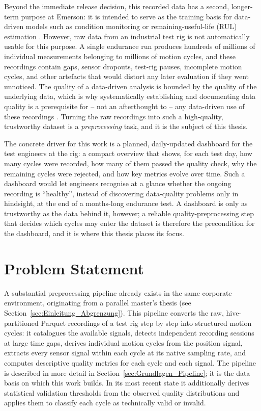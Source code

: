 Beyond the immediate release decision, this recorded data has a second, longer-term
purpose at Emerson: it is intended to serve as the training basis for data-driven models
such as condition monitoring or remaining-useful-life (RUL)
estimation \parencite{TODO-condition-monitoring}. However, raw data from an industrial
test rig is not automatically usable for this purpose. A single endurance run produces
hundreds of millions of individual measurements belonging to millions of motion cycles,
and these recordings contain gaps, sensor dropouts, test-rig pauses, incomplete motion
cycles, and other artefacts that would distort any later evaluation if they went
unnoticed. The quality of a data-driven analysis is bounded by the quality of the
underlying data, which is why systematically establishing and documenting data quality is
a prerequisite for -- not an afterthought to -- any data-driven use of these
recordings \parencite{TODO-data-quality}. Turning the raw recordings into such a
high-quality, trustworthy dataset is a \emph{preprocessing} task, and it is the subject of
this thesis.

The concrete driver for this work is a planned, daily-updated dashboard for the test
engineers at the rig: a compact overview that shows, for each test day, how many cycles
were recorded, how many of them passed the quality check, why the remaining cycles were
rejected, and how key metrics evolve over time. Such a dashboard would let engineers
recognise at a glance whether the ongoing recording is ``healthy'', instead of
discovering data-quality problems only in hindsight, at the end of a months-long endurance
test. A dashboard is only as trustworthy as the data behind it, however; a reliable
quality-preprocessing step that decides which cycles may enter the dataset is therefore
the precondition for the dashboard, and it is where this thesis places its focus.

\section{Problem Statement}
\label{sec:Einleitung_Problemstellung}

A substantial preprocessing pipeline already exists in the same corporate environment,
originating from a parallel master's thesis (see Section~\ref{sec:Einleitung_Abgrenzung}).
This pipeline converts the raw, hive-partitioned Parquet recordings of a test rig
step by step into structured motion cycles: it catalogues the available signals, detects
independent recording sessions at large time gaps, derives individual motion cycles from
the position signal, extracts every sensor signal within each cycle at its native
sampling rate, and computes descriptive quality metrics for each cycle and each signal.
The pipeline is described in more detail in Section~\ref{sec:Grundlagen_Pipeline}; it is
the data basis on which this work builds. In its most recent state it additionally derives
statistical validation thresholds from the observed quality distributions and applies them
to classify each cycle as technically valid or invalid.

